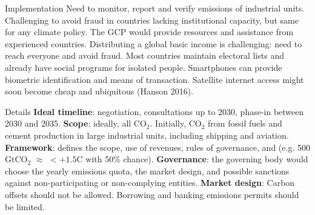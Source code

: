 \documentclass[aspectratio=169,xcolor=dvipsnames, 11pt,mathserif]{beamer}
\begin{document}
\begin{framefont}{\small}
\begin{frame}{Implementation}
    \bbsp \ip Need to monitor, report and verify emissions of industrial units.
        \bbsp \ip Challenging to avoid fraud in countries lacking institutional capacity, but same for any climate policy.
        \ip The GCP would provide resources and assistance from experienced countries. \ee
    \ip Distributing a global basic income is challenging: need to reach everyone and avoid fraud.
        \bbsp \ip Most countries maintain electoral lists and already have social programs for isolated people.
        \ip Smartphones can provide biometric identification and means of transaction.
        \ip Satellite internet access might soon become cheap and ubiquitous (Hanson 2016).
        \ee
    \ee 
\end{frame}

\begin{frame}{Details}
    \bbsp \ip \textbf{Ideal timeline}: negotiation, consultations up to 2030, phase-in between 2030 and 2035.
    \ip \textbf{Scope}: ideally, all CO$_\text{2}$. Initially, CO$_\text{2}$ from fossil fuels and cement production in large industrial units, including shipping and aviation.
    \ip \textbf{Framework}: defines the scope, use of revenues, rules of governance, and  (e.g. 500 GtCO$_\text{2}$ 
    $\approx$ $<+1.5$\textdegree{}C with 50\% chance). %
    \ip \textbf{Governance}: the governing body would choose the yearly emissions quota, the market design, and possible sanctions against non-participating or non-complying entities. %
    \ip \textbf{Market design}: Carbon offsets should not be allowed. Borrowing and banking emissions permits should be limited.
    \ee
\end{frame}



\end{framefont}
\end{document}
